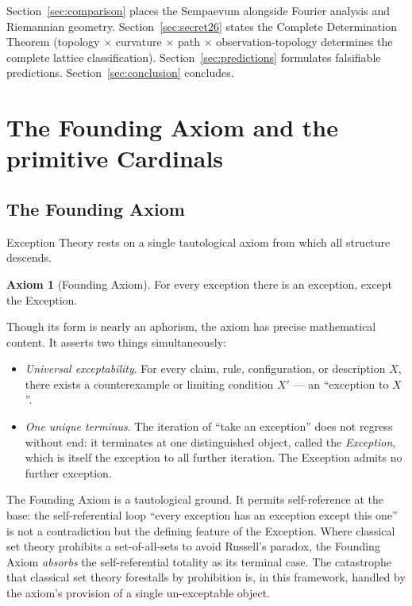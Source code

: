 \documentclass[11pt,a4paper]{article}
\theoremstyle{definition}
\newtheorem{axiom}[theorem]{Axiom}
\theoremstyle{remark}
\begin{document}
Section~\ref{sec:comparison} places the Sempaevum alongside Fourier analysis and Riemannian geometry. Section~\ref{sec:secret26} states the Complete Determination Theorem (topology $\times$ curvature $\times$ path $\times$ observation-topology determines the complete lattice classification). Section~\ref{sec:predictions} formulates falsifiable predictions. Section~\ref{sec:conclusion} concludes.

\section{The Founding Axiom and the primitive Cardinals}\label{sec:primitives}

\subsection{The Founding Axiom}

Exception Theory rests on a single tautological axiom from which all structure descends.

\begin{axiom}[Founding Axiom]\label{ax:founding}
For every exception there is an exception, except the Exception.
\end{axiom}

Though its form is nearly an aphorism, the axiom has precise mathematical content. It asserts two things simultaneously:
\begin{itemize}[leftmargin=*]
\item \emph{Universal exceptability}. For every claim, rule, configuration, or description $X$, there exists a counterexample or limiting condition $X'$ --- an ``exception to $X$''.
\item \emph{One unique terminus}. The iteration of ``take an exception'' does not regress without end: it terminates at one distinguished object, called the \emph{Exception}, which is itself the exception to all further iteration. The Exception admits no further exception.
\end{itemize}

The Founding Axiom is a tautological ground. It permits self-reference at the base: the self-referential loop ``every exception has an exception except this one'' is not a contradiction but the defining feature of the Exception. Where classical set theory prohibits a set-of-all-sets to avoid Russell's paradox, the Founding Axiom \emph{absorbs} the self-referential totality as its terminal case. The catastrophe that classical set theory forestalls by prohibition is, in this framework, handled by the axiom's provision of a single un-exceptable object.
\end{document}
